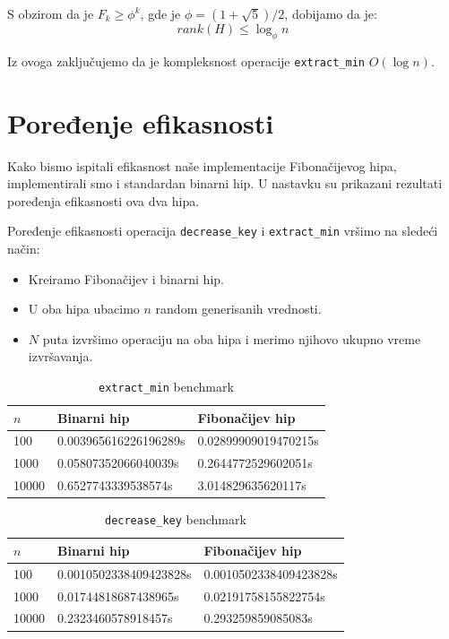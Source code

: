 \documentclass[a4paper]{article}
\theoremstyle{plain}
\theoremstyle{definition}
\begin{document}
S obzirom da je $F_{k} \geq \phi^{k}$, gde je $\phi = (1 + \sqrt{5}) / 2$, dobijamo da je:
$$rank(H) \leq \log_{\phi}{n} $$

Iz ovoga zaklju\v{c}ujemo da je kompleksnost operacije \texttt{extract\_min} $O(\log{n})$.

\section{Poređenje efikasnosti}
\label{sec:Exp}
Kako bismo ispitali efikasnost na\v{s}e implementacije Fibona\v{c}ijevog hipa, implementirali smo i standardan binarni hip. U nastavku su prikazani rezultati poređenja efikasnosti ova dva hipa.

Poređenje efikasnosti operacija \texttt{decrease\_key} i \texttt{extract\_min} vr\v{s}imo na slede\'{c}i na\v{c}in:
\begin{itemize}
    \item Kreiramo Fibona\v{c}ijev i binarni hip.
    \item U oba hipa ubacimo $n$ random generisanih vrednosti.
    \item $N$ puta izvr\v{s}imo operaciju na oba hipa i merimo njihovo ukupno vreme izvr\v{s}avanja.
\end{itemize}

\begin{table}[H]
    \centering
    \begin{tabular}{|l|l|l|}
        \hline
        $n$    & Binarni hip           & Fibona\v{c}ijev hip  \\
        \hline
        100    & 0.003965616226196289s & 0.02899909019470215s \\
        1000   & 0.05807352066040039s  & 0.2644772529602051s  \\
        10000  & 0.6527743339538574s   & 3.014829635620117s   \\
        \hline
    \end{tabular}
\label{tbl:fig1}
\caption{\texttt{extract\_min} benchmark}
\end{table}

\begin{table}[H]
    \centering
    \begin{tabular}{|l|l|l|}
        \hline
        $n$    & Binarni hip            & Fibona\v{c}ijev hip    \\
        \hline
        100    & 0.0010502338409423828s & 0.0010502338409423828s \\
        1000   & 0.01744818687438965s   & 0.02191758155822754s   \\
        10000  & 0.2323460578918457s    & 0.293259859085083s     \\
        \hline
    \end{tabular}
\label{tbl:fig1}
\caption{\texttt{decrease\_key} benchmark}
\end{table}


\appendix



\end{document}
